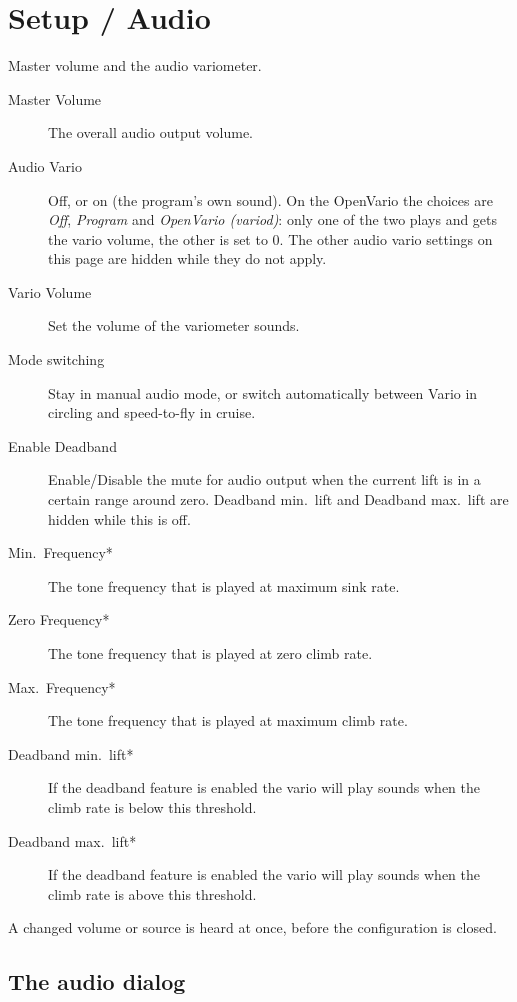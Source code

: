 \section{Setup / Audio}\label{sec:audiovario-gauge}

Master volume and the audio variometer. \label{conf:audiovariogauge}

\begin{description}
\item[Master Volume]  The overall audio output volume.
\item[Audio Vario]  Off, or on (the program's own sound).  On the
  OpenVario the choices are \emph{Off}, \emph{Program} and
  \emph{OpenVario (variod)}: only one of the two plays and gets the
  vario volume, the other is set to 0.  The other audio vario settings
  on this page are hidden while they do not apply.
\item[Vario Volume]  Set the volume of the variometer sounds.
\item[Mode switching]  Stay in manual audio mode, or switch automatically
  between Vario in circling and speed-to-fly in cruise.
\item[Enable Deadband]  Enable/Disable the mute for audio output when the current lift is in a certain range around zero. Deadband min.\ lift and Deadband max.\ lift are hidden while this is off.
\item[Min.\ Frequency*]  The tone frequency that is played at maximum sink rate.
\item[Zero Frequency*]  The tone frequency that is played at zero climb rate.
\item[Max.\ Frequency*]  The tone frequency that is played at maximum climb rate.
\item[Deadband min.\ lift*]  If the deadband feature is enabled the vario will play sounds when the climb rate is below this threshold.
\item[Deadband max.\ lift*]  If the deadband feature is enabled the vario will play sounds when the climb rate is above this threshold.
\end{description}

A changed volume or source is heard at once, before the configuration
is closed.

\subsection*{The audio dialog}

